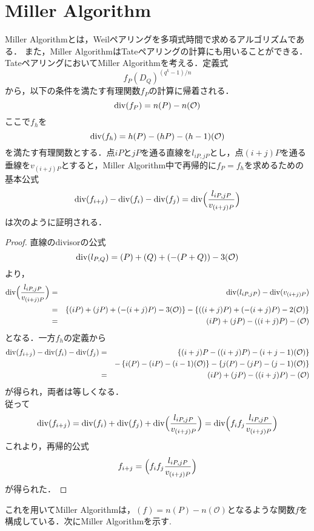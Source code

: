 \section{Miller Algorithm}
\par
Miller Algorithm\cite{MIA}とは，Weilペアリングを多項式時間で求めるアルゴリズムである．
また，Miller AlgorithmはTateペアリングの計算にも用いることができる．TateペアリングにおいてMiller Algorithmを考える．定義式
\[
f_P(D_Q)^{{(q^k-1)}/n}
\]
から，以下の条件を満たす有理関数$f_P$の計算に帰着される．
\[
{\rm div}(f_P)=n(P)-n(\mathcal{O})
\]
ここで$f_h$を
\[
{\rm div}(f_h)=h(P)-(hP)-(h-1)(\mathcal{O})
\]
を満たす有理関数とする．点$iP$と$jP$を通る直線を$l_{iP,jP}$とし，点$(i+j)P$を通る垂線を$v_{(i+j)P}$とすると，Miller Algorithm中で再帰的に$f_P=f_h$を求めるための基本公式
\[
{\rm div}(f_{i+j})-{\rm div}(f_i)-{\rm div}(f_j)={\rm div}\Bigl(\frac{l_{iP,jP}}{v_{(i+j)P}}\Bigr)
\]
は次のように証明される．
\begin{proof}
直線のdivisorの公式
\[
{\rm div}(l_{P,Q})=(P)+(Q)+(-(P+Q))-3(\mathcal{O})
\]
より，
\begin{eqnarray*}
{\rm div}\Bigl(\frac{l_{iP,jP}}{v_{(i+j)P}}\Bigr)&=&{\rm div}(l_{iP,jP})-{\rm div}(v_{(i+j)P})\\
&=&\left\{(iP)+(jP)+(-(i+j)P)-3(\mathcal{O})\right\}-\left\{((i+j)P)+(-(i+j)P)-2(\mathcal{O})\right\}\\
&=&(iP)+(jP)-((i+j)P)-(\mathcal{O})
\end{eqnarray*}となる．一方$f_h$の定義から
\begin{eqnarray*}
{\rm div}(f_{i+j})-{\rm div}(f_i)-{\rm div}(f_j)&=&\left\{(i+j)P-((i+j)P)-(i+j-1)(\mathcal{O})\right\}\\
&\ \ \ &-\left\{i(P)-(iP)-(i-1)(\mathcal{O})\right\}-\left\{j(P)-(jP)-(j-1)(\mathcal{O})\right\}\\
&=&(iP)+(jP)-((i+j)P)-(\mathcal{O})
\end{eqnarray*}が得られ，両者は等しくなる．\\
従って
\[
{\rm div}(f_{i+j})={\rm div}(f_i)+{\rm div}(f_j)+{\rm div}\Bigl(\frac{l_{iP,jP}}{v_{(i+j)P}}\Bigr)={\rm div}\Bigl(f_if_j\frac{l_{iP,jP}}{v_{(i+j)P}}\Bigr)
\]
これより，再帰的公式
\[
f_{i+j}=\Bigl(f_if_j\frac{l_{iP,jP}}{v_{(i+j)P}}\Bigr)
\]が得られた．
\end{proof}
これを用いてMiller Algorithmは，$(f) = n(P) - n(\mathcal{O})$となるような関数$f$を構成している．次にMiller Algorithmを示す.
\par
